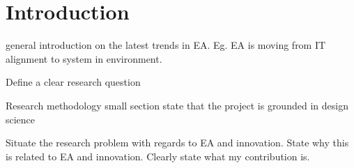 
\chapter{Introduction} %

\label{Chapter1} %



general introduction on the latest trends in EA. Eg. EA is moving from IT alignment to system in environment.

Define a clear research question

Research methodology small section state that the project is grounded in design science

Situate the research problem with regards to EA and innovation.	
State why this is related to EA and innovation.
Clearly state what my contribution is.


